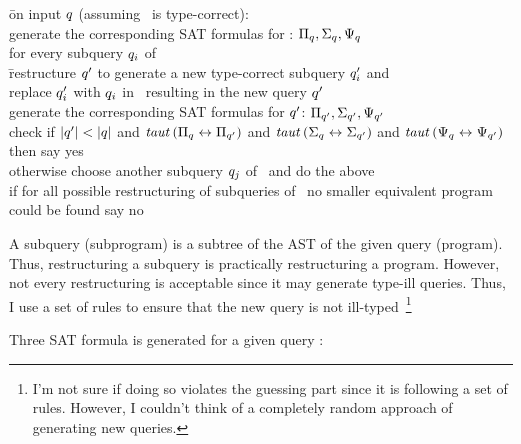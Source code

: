 \documentclass[12pt]{article}
\begin{document}
\begin{tabbing}
\qquad \= on input $\vQ$ (assuming \vQ\ is type-correct):\\
\> generate the corresponding SAT formulas for \vQ: $\Pi_\vQ, \Sigma_\vQ, \Psi_\vQ$\\
\> for every subquery $\vQ_i$ of \vQ\\
\> \qquad \= restructure $\vQ^\prime$ to generate a new type-correct subquery $\vQ_i^{\prime}$ and\\ 
\> \qquad \qquad replace $\vQ_i^{\prime}$ with $\vQ_i$  in \vQ\ resulting in the new query $\vQ^\prime$\\
\> \qquad generate the corresponding SAT formulas for $\vQ^\prime$: $\Pi_{\vQ^\prime}, \Sigma_{\vQ^\prime}, \Psi_{\vQ^\prime}$\\
\> \qquad check if $|\vQ^\prime| < |\vQ| $ and $\taut {\Pi_\vQ \leftrightarrow \Pi_{\vQ^\prime}}$
and $\taut {\Sigma_\vQ \leftrightarrow \Sigma_{\vQ^\prime}}$ and $\taut {\Psi_\vQ \leftrightarrow \Psi_{\vQ^\prime}}$ \\
\> \qquad \qquad then say yes\\
\> \qquad otherwise choose another subquery $\vQ_j$ of \vQ\ and do the above\\
\> if for all possible restructuring of subqueries of \vQ\ no smaller equivalent program\\
\> \qquad could be found say no
\end{tabbing}

A subquery (subprogram) is a subtree of the AST of the given query (program).
Thus, restructuring a subquery is practically restructuring a program. However,
not every restructuring is acceptable since it may generate type-ill queries. Thus,
I use a set of rules to ensure that the new query is not ill-typed~\footnote{I'm not
sure if doing so violates the guessing part since it is following a set of rules. However,
I couldn't think of a completely random approach of generating new queries.}

Three SAT formula is generated for a given query \vQ:
\end{document}
